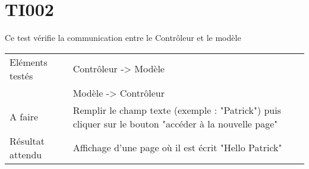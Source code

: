 
\section{TI002}
	Ce test vérifie la communication entre le Contrôleur et le modèle
	\begin{center}
     	\begin{tabular}[h]{|p{}|p{}|}
		\hline
			Eléments testés & Contrôleur -> Modèle \\
						    &  Modèle -> Contrôleur \\\hline
    			A faire & Remplir le champ texte (exemple : "Patrick") puis cliquer sur le bouton "accéder à la nouvelle page" \\\hline
    			Résultat attendu & Affichage d'une page où il est écrit "Hello Patrick" \\\hline
     	\end{tabular}
  	\end{center}	